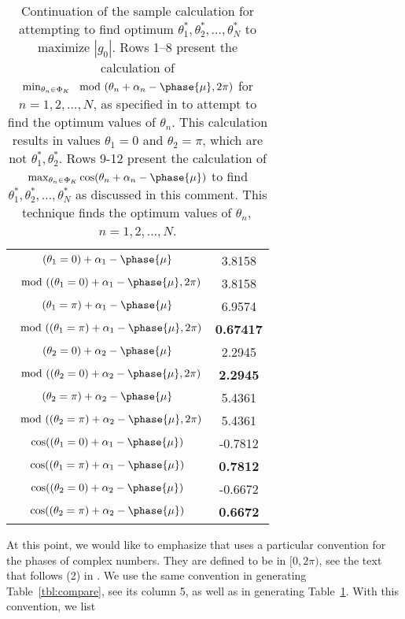 \begin{table}[!t]
\begin{center}
\begin{tabular}{|c|c|}
\hline
$(\theta_1=0)+\alpha_1-\phase{\mu}$&{3.8158}\\
$\mod((\theta_1=0)+\alpha_1-\phase{\mu},2\pi)$&{3.8158}\\
$(\theta_1=\pi)+\alpha_1-\phase{\mu}$&{6.9574}\\
$\mod((\theta_1=\pi)+\alpha_1-\phase{\mu},2\pi)$&{\bf 0.67417}\\[0.7mm]
 \hline
$(\theta_2=0)+\alpha_2-\phase{\mu}$&{2.2945}\\
$\mod((\theta_2=0)+\alpha_2-\phase{\mu},2\pi)$&{\bf 2.2945}\\
$(\theta_2=\pi)+\alpha_2-\phase{\mu}$&{5.4361}\\
$\mod((\theta_2=\pi)+\alpha_2-\phase{\mu},2\pi)$&{5.4361}\\[0.7mm]
 \hline
$\cos((\theta_1=0)+\alpha_1-\phase{\mu})$&{-0.7812}\\
$\cos((\theta_1=\pi)+\alpha_1-\phase{\mu})$&{\bf 0.7812}\\[0.7mm]
 \hline
$\cos((\theta_2=0)+\alpha_2-\phase{\mu})$&{-0.6672}\\
$\cos((\theta_2=\pi)+\alpha_2-\phase{\mu})$&{\bf 0.6672}\\[0.7mm]
\hline
\end{tabular}
\caption{Continuation of the sample calculation for attempting to find optimum $\theta_1^*, \theta_2^*,\ldots,\theta_N^*$ to maximize $|g_0|$. Rows 1--8 present the calculation of $\min_{\theta_n\in \Phi_K} \mod (\theta_n + \alpha_n - \phase{\mu}, 2\pi)$ for $n=1,2,\ldots,N$, as specified in \cite{b1} to attempt to find the optimum values of $\theta_n$. This calculation results in values $\theta_1=0$ and $\theta_2=\pi$, which are not $\theta_1^*, \theta_2^*$. Rows 9-12 present the calculation of $\max_{\theta_n\in \Phi_K} \cos(\theta_n + \alpha_n - \phase{\mu})$ to find $\theta_1^*, \theta_2^*, \ldots, \theta_N^*$ as discussed in this comment. This technique finds the optimum values of $\theta_n,$ $n=1,2,\ldots, N$.
}
\label{tbl:compare2}
\end{center}
\end{table}
At this point, we would like to emphasize that \cite{b1} uses a particular convention for the
phases of complex numbers. They are defined to be in $[0, 2\pi)$, see the text that follows
(2) in \cite{b1}. We use the same convention in generating Table~\ref{tbl:compare}, see its
column 5, as well as in generating Table~\ref{tbl:compare2}. With this convention, we list
